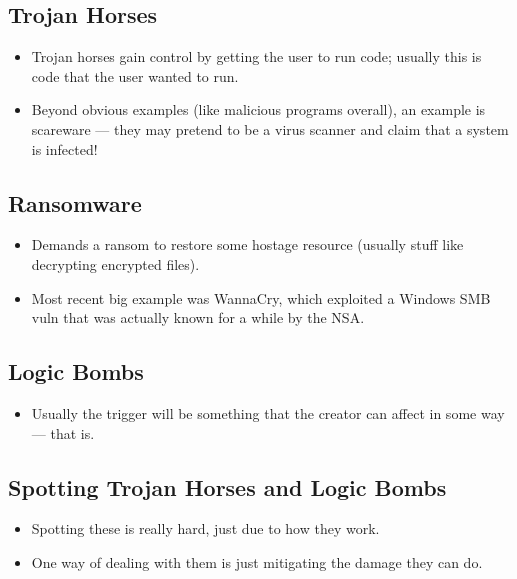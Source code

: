 \documentclass{article}
\begin{document}
\subsection{Trojan Horses}
\begin{itemize}
    \item Trojan horses gain control by getting the user to run code; usually this is code that the user wanted to run.
    \item Beyond obvious examples (like malicious programs overall), an example is scareware --- they may pretend to be a virus scanner and claim that a system is infected!
\end{itemize}

\subsection{Ransomware}
\begin{itemize}
    \item Demands a ransom to restore some hostage resource (usually stuff like decrypting encrypted files).
    \item Most recent big example was WannaCry, which exploited a Windows SMB vuln that was actually known for a while by the NSA.
\end{itemize}

\subsection{Logic Bombs}
\begin{itemize}
    \item Usually the trigger will be something that the creator can affect in some way --- that is.
\end{itemize}

\subsection{Spotting Trojan Horses and Logic Bombs}
\begin{itemize}
    \item Spotting these is really hard, just due to how they work.
    \item One way of dealing with them is just mitigating the damage they can do.
\end{itemize}
\end{document}
